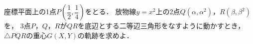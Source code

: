 \documentclass[../../main.tex]{subfiles}
\begin{document}
座標平面上の1点$P \displaystyle \left( \dfrac{1}{2},\dfrac{1}{4} \right)$をとる．
放物線$y=x^2$上の2点$Q(\alpha,{\alpha}^2)$，$R(\beta,{\beta}^2)$を，
3点$P$，$Q$，$R$が$QR$を底辺とする二等辺三角形をなすように動かすとき，
$\triangle PQR$の重心$G(X,Y)$の軌跡を求めよ．
\end{document}
